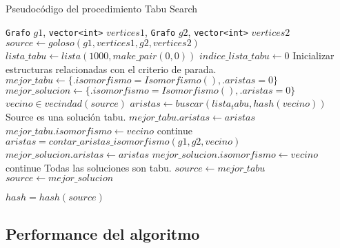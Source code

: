 \begin{algorithm}[H]
  \begin{algorithmic}[1]
  \caption{Pseudocódigo del procedimiento Tabu Search}
  \label{algo:6-1}
              {\texttt{Grafo} $g1$,
               \texttt{vector<int>} $vertices1$,
               \texttt{Grafo} $g2$,
               \texttt{vector<int>} $vertices2$} 
    \State $source \gets goloso(g1, vertices1, g2, vertices2)$
    \State $lista\_tabu \gets lista(1000, make\_pair(0, 0))$
    \State $indice\_lista\_tabu \gets 0$
    \State Inicializar estructuras relacionadas con el criterio de parada.
       \State $mejor\_tabu \gets \{.isomorfismo = Isomorfismo(), .aristas = 0\}$
       \State $mejor\_solucion \gets \{.isomorfismo = Isomorfismo(), .aristas = 0\}$
       \For $vecino \in vecindad(source)$
           \State $aristas \gets buscar(lista_tabu, hash(vecino))$
               \State Source es una solución tabu.
                   \State $mejor\_tabu.aristas \gets aristas$
                   \State $mejor\_tabu.isomorfismo \gets vecino$
                   \State continue
               \EndIf
           \Else
               \State $aristas = contar\_aristas\_isomorfismo(g1, g2, vecino)$
                   \State $mejor\_solucion.aristas \gets aristas$
                   \State $mejor\_solucion.isomorfismo \gets vecino$
                   \State continue
               \EndIf
           \EndIf
        \EndFor
           \State Todas las soluciones son tabu.
           \State $source \gets mejor\_tabu$
       \Else
           \State $source \gets mejor\_solucion$
       \EndIf

       \State $hash = hash(source)$


    \EndWhile
           
		\EndProcedure
	\end{algorithmic}
\end{algorithm}






\subsection{Performance del algoritmo}



